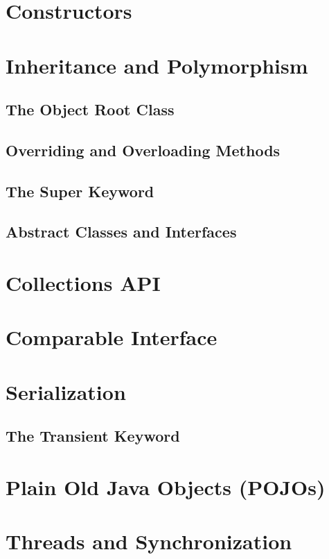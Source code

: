 \documentclass{article}
\begin{document}
\section{Constructors}

\section{Inheritance and Polymorphism}

\subsection{The Object Root Class}

\subsection{Overriding and Overloading Methods}

\subsection{The Super Keyword}

\subsection{Abstract Classes and Interfaces}

\section{Collections API}

\section{Comparable Interface}

\section{Serialization}

\subsection{The Transient Keyword}

\section{Plain Old Java Objects (POJOs)}

\section{Threads and Synchronization}
\end{document}
